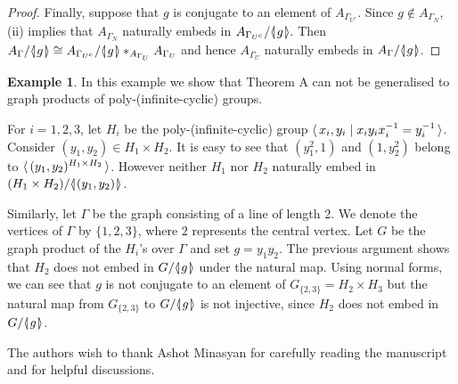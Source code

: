 \documentclass[12pt, a4paper]{amsart}
\theoremstyle{remark}
\theoremstyle{definition}
\newtheorem{Ex}[Thm]{Example}
\begin{document}
\begin{proof}
Finally, suppose that $g$ is conjugate to an element of $A_{{\Gamma}_{U^c}}$. Since $g\notin A_{{\Gamma}_N}$, (ii) implies that $A_{{\Gamma}_N}$ naturally embeds in $A_{{\Gamma}_{U^c}}/{{\langle}{\mkern-3.7mu}{\lvert}{\mkern1.2mu}{{g}}{\mkern1.2mu}{\rvert}{\mkern-3.7mu}{\rangle}}.$ Then $A_{\Gamma}/{{\langle}{\mkern-3.7mu}{\lvert}{\mkern1.2mu}{{g}}{\mkern1.2mu}{\rvert}{\mkern-3.7mu}{\rangle}}\cong A_{{\Gamma}_{U^c}}/{{\langle}{\mkern-3.7mu}{\lvert}{\mkern1.2mu}{{g}}{\mkern1.2mu}{\rvert}{\mkern-3.7mu}{\rangle}}*_{A_{{\Gamma}_U}}A_{{\Gamma}_U}$ and hence $A_{{\Gamma}_U}$ naturally embeds in $A_{\Gamma}/{{\langle}{\mkern-3.7mu}{\lvert}{\mkern1.2mu}{{g}}{\mkern1.2mu}{\rvert}{\mkern-3.7mu}{\rangle}}$.
\end{proof}

\begin{Ex}
In this example we show that Theorem A can not be generalised to graph products of poly-(infinite-cyclic) groups.

For $i=1,2,3$, let $H_i$ be the poly-(infinite-cyclic) group ${{\langle\mkern3mu{{{x_i,y_i}}\mid {x_iy_ix_i^{-1}=y_i^{-1}}}\mkern3mu\rangle}}$. Consider $(y_1,y_2)\in H_1\times H_2$. It is easy to see that $(y_1^2,1)$ and $(1,y_2^2)$ belong to ${\langle\mkern3mu{(y_1,y_2)^{H_1\times H_2}}\mkern3mu\rangle}$. However neither $H_1$ nor $H_2$ naturally embed in $(H_1\times H_2)/{{\langle}{\mkern-3.7mu}{\lvert}{\mkern1.2mu}{{(y_1,y_2)}}{\mkern1.2mu}{\rvert}{\mkern-3.7mu}{\rangle}}$.

Similarly, let ${\Gamma}$ be the graph consisting of a line of length 2. We denote the vertices of ${\Gamma}$ by $\{1,2,3\}$, where $2$ represents the central vertex. Let $G$ be the graph product of the $H_i$'s over ${\Gamma}$ and set $g=y_1y_2$. The previous argument shows that $H_2$ does not embed in $G/{{\langle}{\mkern-3.7mu}{\lvert}{\mkern1.2mu}{{g}}{\mkern1.2mu}{\rvert}{\mkern-3.7mu}{\rangle}}$ under the natural map. Using normal forms, we can see that $g$ is not conjugate to an element of $G_{\{2,3\}}=H_2 \times H_3$ but the natural map from $G_{\{2,3\}}$ to $G/{{\langle}{\mkern-3.7mu}{\lvert}{\mkern1.2mu}{{g}}{\mkern1.2mu}{\rvert}{\mkern-3.7mu}{\rangle}}$ is not injective, since $H_2$ does not embed in $G/{{\langle}{\mkern-3.7mu}{\lvert}{\mkern1.2mu}{{g}}{\mkern1.2mu}{\rvert}{\mkern-3.7mu}{\rangle}}$.
\end{Ex}

\medskip

 The authors wish to thank Ashot Minasyan for carefully reading the manuscript and for helpful discussions. 
\end{document}
